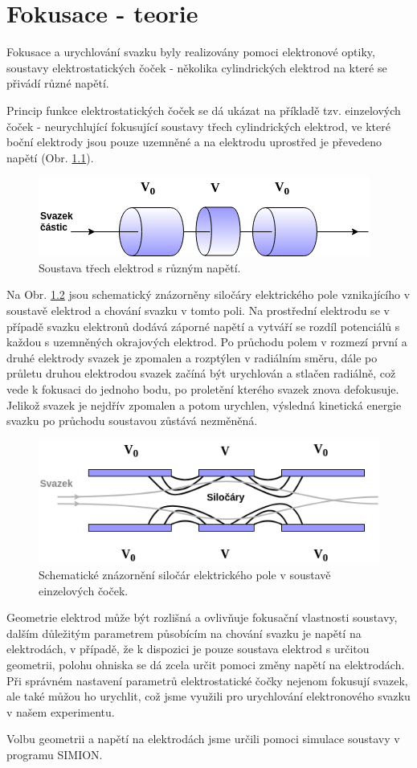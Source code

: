 \newpage
\chapter{Fokusace - teorie} 

Fokusace a urychlování svazku byly realizovány pomoci elektronové optiky, soustavy elektrostatických čoček - několika cylindrických elektrod na které se přivádí různé napětí.  

Princip funkce elektrostatických čoček se dá ukázat na příkladě tzv. einzelových čoček - neurychlující fokusující soustavy třech cylindrických elektrod, ve které boční elektrody jsou pouze uzemněné a na elektrodu uprostřed je převedeno napětí (Obr. \ref{einzel}). 
\begin{figure}[H]
\includegraphics[width=.8\linewidth]{Figure/05/einzel.png}
\caption{Soustava třech elektrod s různým napětí.}
\label{einzel}
\end{figure}

Na Obr. \ref{pole} jsou schematický znázorněny siločáry elektrického pole vznikajícího v soustavě elektrod a chování svazku v tomto poli. Na prostřední elektrodu se v případě svazku elektronů dodává záporné napětí a vytváří se rozdíl potenciálů s každou s uzemněných okrajových elektrod. Po průchodu polem v rozmezí první a druhé elektrody svazek je zpomalen a rozptýlen v radiálním směru, dále po průletu druhou elektrodou svazek začíná být urychlován a stlačen radiálně, což vede k fokusaci do jednoho bodu, po proletění kterého svazek znova defokusuje. Jelikož svazek je nejdřív zpomalen a potom urychlen, výsledná kinetická energie svazku po průchodu soustavou zůstává nezměněná. 
\begin{figure}[H]
\includegraphics[width=.8\linewidth]{Figure/05/pole.png}
\caption{Schematické znázornění siločár elektrického pole v soustavě einzelových čoček.  }
\label{pole}
\end{figure}

Geometrie elektrod může být rozlišná a ovlivňuje fokusační vlastnosti soustavy, dalším důležitým parametrem působícím na chování svazku je napětí na elektrodách, v případě, že k dispozici je pouze soustava elektrod s určitou geometrii, polohu ohniska se dá zcela určit pomoci změny napětí na elektrodách. Při správném nastavení parametrů elektrostatické čočky nejenom fokusují svazek, ale také můžou ho urychlit, což jsme využili pro urychlování elektronového svazku v našem experimentu. 

Volbu geometrii a napětí na elektrodách jsme určili pomoci simulace soustavy v programu SIMION. 


